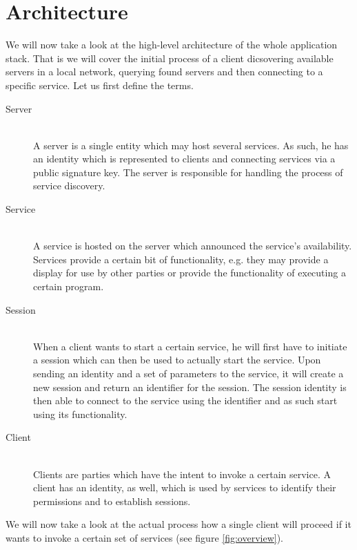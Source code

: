 \section{Architecture}

We will now take a look at the high-level architecture of the whole application stack.
That is we will cover the initial process of a client dicsovering available servers in a local network, querying found servers and then connecting to a specific service.
Let us first define the terms.

\begin{description}
    \item[Server]\hfill\\
        A server is a single entity which may host several services.
        As such, he has an identity which is represented to clients and connecting services via a public signature key.
        The server is responsible for handling the process of service discovery.
    \item[Service]\hfill\\
        A service is hosted on the server which announced the service's availability.
        Services provide a certain bit of functionality, e.g. they may provide a display for use by other parties or provide the functionality of executing a certain program.
    \item[Session]\hfill\\
        When a client wants to start a certain service, he will first have to initiate a session which can then be used to actually start the service.
        Upon sending an identity and a set of parameters to the service, it will create a new session and return an identifier for the session.
        The session identity is then able to connect to the service using the identifier and as such start using its functionality.
    \item[Client]\hfill\\
        Clients are parties which have the intent to invoke a certain service.
        A client has an identity, as well, which is used by services to identify their permissions and to establish sessions.
\end{description}

We will now take a look at the actual process how a single client will proceed if it wants to invoke a certain set of services (see figure \ref{fig:overview}).

